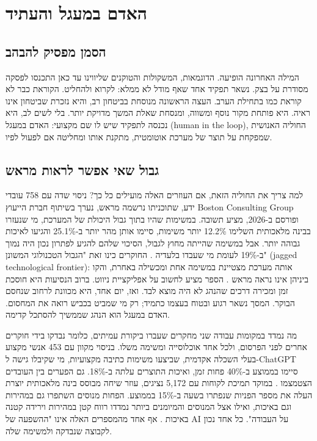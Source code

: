 \chapter{האדם במעגל והעתיד}\label{ch:07}
\section{הסמן מפסיק להבהב}
המילה האחרונה הופיעה. הדוגמאות, המשקולות והטוקנים שליווינו עד כאן התכנסו לפסקה מסודרת על בצק. נשאר תפקיד אחד שאף מודל לא ממלא: לקרוא ולהחליט.
הקוראת כבר לא קוראת כמו בתחילת הערב. העצה הראשונה מנוסחת בביטחון רב, והיא נזכרת שביטחון אינו ראיה. היא פותחת מקור נוסף ומשווה, ומנסחת שאלת המשך מדויקת יותר. בלי לשים לב, היא נכנסה לתפקיד שיש לו שם מקצועי: האדם במעגל (human in the loop), החוליה האנושית שמפקחת על תוצר של מערכת אוטומטית, מתקנת אותו ומחליטה אם לפעול לפיו.
\section{גבול שאי אפשר לראות מראש}
למה צריך את החוליה הזאת, אם העוזרים האלה מועילים כל כך? ניסוי שדה עם 758 עובדי ידע, שתוכניתו נרשמה מראש, נערך בשיתוף חברת הייעוץ Boston Consulting Group ופורסם ב-2026, מציע תשובה. במשימות שהיו בתוך גבול היכולת של המערכת, מי שנעזרו בבינה מלאכותית השלימו 12.2\% יותר משימות, סיימו אותן מהר יותר ב-25.1\% והגיעו לאיכות גבוהה יותר. אבל במשימה שהייתה מחוץ לגבול, הסיכוי שלהם להגיע לפתרון נכון היה נמוך ב-19\% לעומת מי שעבדו בלעדיה \cite{S-ch07-04}. החוקרים כינו זאת "הגבול הטכנולוגי המשונן" (jagged technological frontier): אותה מערכת מצטיינת במשימה אחת ומכשילה באחרת, והקו ביניהן אינו נראה מראש \cite{S-ch07-04}.
הספר מציע לחשוב על אפליקציית ניווט. ברוב הנסיעות היא חוסכת זמן ומכירה דרכים שהנהג לא היה מוצא לבד. ואז, יום אחד, היא מכוונת לרחוב שנחסם הבוקר. המסך נשאר רגוע ובטוח בעצמו כתמיד; רק מי שמביט בכביש רואה את המחסום. האדם במעגל הוא הנהג שממשיך להסתכל קדימה.
\begin{labbox}{מה נמדד במקומות עבודה}
שני מחקרים שעברו ביקורת עמיתים, כלומר נבדקו בידי חוקרים אחרים לפני הפרסום, ולכל אחד אוכלוסייה ומשימה משלו.
בניסוי מקוון עם 453 אנשי מקצוע בעלי השכלה אקדמית, שביצעו משימות כתיבה מקצועיות, מי שקיבלו גישה ל-ChatGPT סיימו בממוצע ב-40\% פחות זמן, ואיכות התוצרים עלתה ב-18\%. גם הפערים בין העובדים הצטמצמו \cite{S-ch07-01}.
במוקד תמיכת לקוחות עם 5,172 נציגים, עוזר שיחה מבוסס בינה מלאכותית יוצרת העלה את מספר הפניות שנפתרו בשעה ב-15\% בממוצע. הפחות מנוסים השתפרו גם במהירות וגם באיכות, ואילו אצל המנוסים והמיומנים ביותר נמדדו רווח קטן במהירות וירידה קטנה באיכות \cite{S-ch07-03}.
אף אחד מהמספרים האלה אינו "ההשפעה של AI על העבודה". כל אחד נכון לקבוצה שנבדקה ולמשימה שלה.
\end{labbox}
